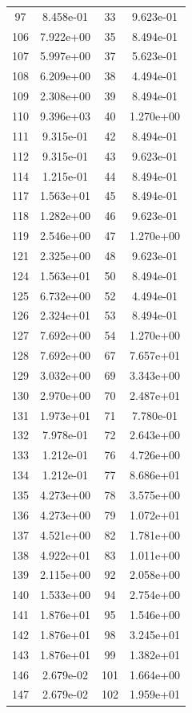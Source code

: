 \documentclass[12pt]{article}
\begin{document}
\begin{longtable}{@{}cccc@{}}
97 & 8.458e-01 & 33 & 9.623e-01 \\
106 & 7.922e+00 & 35 & 8.494e-01 \\
107 & 5.997e+00 & 37 & 5.623e-01 \\
108 & 6.209e+00 & 38 & 4.494e-01 \\
109 & 2.308e+00 & 39 & 8.494e-01 \\
110 & 9.396e+03 & 40 & 1.270e+00 \\
111 & 9.315e-01 & 42 & 8.494e-01 \\
112 & 9.315e-01 & 43 & 9.623e-01 \\
114 & 1.215e-01 & 44 & 8.494e-01 \\
117 & 1.563e+01 & 45 & 8.494e-01 \\
118 & 1.282e+00 & 46 & 9.623e-01 \\
119 & 2.546e+00 & 47 & 1.270e+00 \\
121 & 2.325e+00 & 48 & 9.623e-01 \\
124 & 1.563e+01 & 50 & 8.494e-01 \\
125 & 6.732e+00 & 52 & 4.494e-01 \\
126 & 2.324e+01 & 53 & 8.494e-01 \\
127 & 7.692e+00 & 54 & 1.270e+00 \\
128 & 7.692e+00 & 67 & 7.657e+01 \\
129 & 3.032e+00 & 69 & 3.343e+00 \\
130 & 2.970e+00 & 70 & 2.487e+01 \\
131 & 1.973e+01 & 71 & 7.780e-01 \\
132 & 7.978e-01 & 72 & 2.643e+00 \\
133 & 1.212e-01 & 76 & 4.726e+00 \\
134 & 1.212e-01 & 77 & 8.686e+01 \\
135 & 4.273e+00 & 78 & 3.575e+00 \\
136 & 4.273e+00 & 79 & 1.072e+01 \\
137 & 4.521e+00 & 82 & 1.781e+00 \\
138 & 4.922e+01 & 83 & 1.011e+00 \\
139 & 2.115e+00 & 92 & 2.058e+00 \\
140 & 1.533e+00 & 94 & 2.754e+00 \\
141 & 1.876e+01 & 95 & 1.546e+00 \\
142 & 1.876e+01 & 98 & 3.245e+01 \\
143 & 1.876e+01 & 99 & 1.382e+01 \\
146 & 2.679e-02 & 101 & 1.664e+00 \\
147 & 2.679e-02 & 102 & 1.959e+01 \\

\end{longtable}
\end{document}

